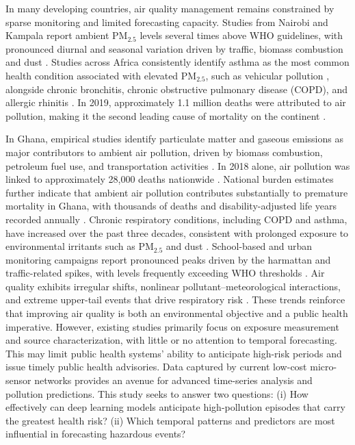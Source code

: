 \documentclass[a4paper,fleqn]{cas-sc}
\begin{document}
In many developing countries, air quality management remains constrained by sparse monitoring and limited forecasting capacity. Studies from Nairobi and Kampala report ambient PM$_{2.5}$ levels several times above WHO guidelines, with pronounced diurnal and seasonal variation driven by traffic, biomass combustion and dust \cite{atuyambe2025air,singh2022urban}. Studies across Africa consistently identify asthma as the most common health condition associated with elevated PM$_{2.5}$, such as vehicular pollution \cite{glenn2022ambient}, alongside chronic bronchitis, chronic obstructive pulmonary disease (COPD), and allergic rhinitis \cite{nkansah2025assessment}. In 2019, approximately 1.1 million deaths were attributed to air pollution, making it the second leading cause of mortality on the continent \cite{nkansah2025assessment}.

In Ghana, empirical studies identify particulate matter and gaseous emissions as major contributors to ambient air pollution, driven by biomass combustion, petroleum fuel use, and transportation activities \cite {amegah2022particulate,nkansah2025assessment}. In 2018 alone, air pollution was linked to approximately 28,000 deaths nationwide \cite{sewor2021ghana}. National burden estimates further indicate that ambient air pollution contributes substantially to premature mortality in Ghana, with thousands of deaths and disability-adjusted life years recorded annually \cite{owusu2020global}. Chronic respiratory conditions, including COPD and asthma, have increased over the past three decades, consistent with prolonged exposure to environmental irritants such as PM$_{2.5}$ and dust \cite{mensah2025burden}. 
School-based and urban monitoring campaigns report pronounced peaks driven by the harmattan and traffic-related spikes, with levels frequently exceeding WHO thresholds \cite{lu2021estimating,owusu2025spatiotemporal}. Air quality exhibits irregular shifts, nonlinear pollutant–meteorological interactions, and extreme upper-tail events that drive respiratory risk \cite{alli2021spatial}. These trends reinforce that improving air quality is both an environmental objective and a public health imperative. However, existing studies primarily focus on exposure measurement and source characterization, with little or no attention to temporal forecasting. This may limit public health systems' ability to anticipate high-risk periods and issue timely public health advisories. Data captured by current low-cost micro-sensor networks provides an avenue for advanced time-series analysis and pollution predictions. This study seeks to answer two questions: (i) How effectively can deep learning models anticipate high-pollution episodes that carry the greatest health risk? (ii) Which temporal patterns and predictors are most influential in forecasting hazardous events?
\end{document}
